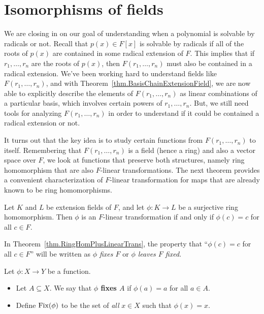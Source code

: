 \section{Isomorphisms of fields}

We are closing in on our goal of understanding when a polynomial is solvable by radicals or not. Recall that $p(x)\in F[x]$ is solvable by radicals if all of the roots of $p(x)$ are contained in some radical extension of $F$. This implies that if $r_1,\ldots,r_n$ are the roots of $p(x)$, then  $F(r_1,\ldots,r_n)$ must also be contained in a radical extension. We've been working hard to understand fields like $F(r_1,\ldots,r_n)$, and with Theorem~\ref{thm.BasisChainExtensionField}, we are now able to explicitly describe the elements of $F(r_1,\ldots,r_n)$ as linear combinations of a particular basis, which involves certain powers of $r_1,\ldots,r_n$. But, we still need tools for analyzing $F(r_1,\ldots,r_n)$ in order to understand if it could be contained a radical extension or not. 

It turns out that the key idea is to study certain functions from $F(r_1,\ldots,r_n)$ to itself. Remembering that $F(r_1,\ldots,r_n)$ is a field (hence a ring) and also a vector space over $F$, we look at functions that preserve both structures, namely ring homomorphism that are also $F$-linear transformations. The next theorem provides a convenient characterization of $F$-linear transformation for maps that are already known to be ring homomorphisms.  
 
\begin{theorem}\label{thm.RingHomPlusLinearTrans}
Let $K$ and $L$ be extension fields of $F$, and let $\phi:K\to L$ be a surjective ring homomorphism. Then $\phi$ is an $F$-linear transformation if and only if $\phi(c) = c$ for all $c\in F$.
\end{theorem}

In Theorem~\ref{thm.RingHomPlusLinearTrans}, the property that ``$\phi(c) = c$ for all $c\in F$'' will be written as \emph{$\phi$ fixes $F$} or \emph{$\phi$ leaves  $F$ fixed}.

\begin{definition}
Let $\phi:X\to Y$ be a function.  
\begin{itemize}
\item Let $A \subseteq X$. We say that \textbf{$\phi$ fixes $A$} if $\phi(a) = a$ for all $a\in A$. 
\item Define $\operatorname{Fix}(\phi)$ to be the set of \emph{all} $x\in X$ such that $\phi(x) = x$.
\end{itemize}
\end{definition}

